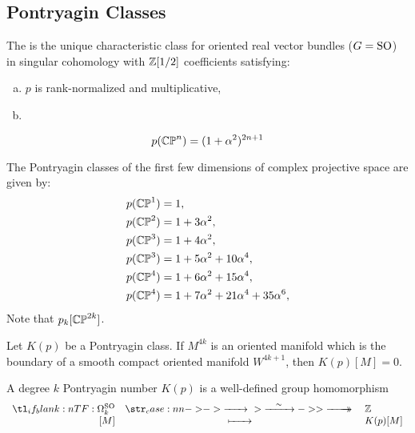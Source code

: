 \subsection{Pontryagin Classes}

\begin{definition}
	The  is the unique characteristic class for oriented real vector bundles ($G=\mathrm{SO}$) in singular cohomology with $\mathbb{Z}[1/2]$ coefficients satisfying:
	\begin{enumerate}[(a)]
		\item $p$ is rank-normalized and multiplicative,
		\item
	\end{enumerate}
\end{definition}

\begin{proposition}\label{prop:pontryagin-class-complex-projective-space}
	\[
		p(\mathbb{CP}^n) = (1+\alpha^2)^{2n+1}
	\]
\end{proposition}

\begin{example}
	The Pontryagin classes of the first few dimensions of complex projective space are given by:
	\[
		\begin{aligned}
			p(\mathbb{CP}^1) & = 1,                                    \\
			p(\mathbb{CP}^2) & = 1+3\alpha^2,                          \\
			p(\mathbb{CP}^3) & = 1+4\alpha^2,                          \\
			p(\mathbb{CP}^3) & = 1+5\alpha^2 + 10\alpha^4,             \\
			p(\mathbb{CP}^4) & = 1+6\alpha^2 + 15\alpha^4,             \\
			p(\mathbb{CP}^4) & = 1+7\alpha^2 + 21\alpha^4+ 35\alpha^6, \\
		\end{aligned}
	\]
	Note that $p_k[\mathbb{CP}^{2k}]$.
\end{example}

\begin{proposition}\label{prop:pontryagin-}
	Let $K(p)$ be a Pontryagin class. If $M^{4k}$ is an oriented manifold which is the boundary of a smooth compact oriented manifold $W^{4k+1}$, then $K(p)[M]=0$.
\end{proposition}

\begin{corollary}
	A degree $k$ Pontryagin number $K(p)$ is a well-defined group homomorphism
	\[
		\lkxfunc{}{\Omega^\SO_k}{\Z}{[M]}{K(p)[M]}
	\]
\end{corollary}

